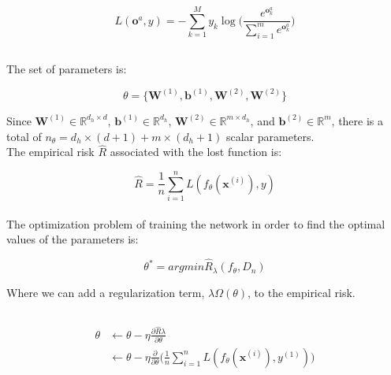 \documentclass[reqno]{amsart}
\theoremstyle{definition}
\theoremstyle{remark}
\numberwithin{equation}{section}
\begin{document}
\begin{equation}
L(\mathbf{o}^a, y) = -\sum_{k=1}^M y_{k}\log \Bigg(     
    \frac{e^{\mathbf{o}_k^a}}{\sum_{i=1}^m e^{\mathbf{o}_k^a}}
\Bigg)
\end{equation}


\subsection{}
The set of parameters is:

\begin{equation}
    \theta = \{\mathbf{W}^{(1)},\mathbf{b}^{(1)}, \mathbf{W}^{(2)}, \mathbf{W}^{(2)}\}
\end{equation}

Since $\mathbf{W}^{(1)} \in \mathbb{R}^{d_h \times d}$, $\mathbf{b}^{(1)} \in \mathbb{R}^{d_h}$, $\mathbf{W}^{(2)} \in \mathbb{R}^{m \times d_h}$, and $\mathbf{b}^{(2)} \in \mathbb{R}^{m}$, there is a total of $n_\theta= d_h \times (d+1) + m \times (d_h+1)$ scalar parameters.\\

The empirical risk $\hat{R}$ associated with the lost function is:

\begin{equation}
    \hat{R} = \frac{1}{n}\sum_{i=1}^{n} L(f_\theta(\mathbf{x}^{(i)}),y)
\end{equation}\\

The optimization problem of training the network in order to find the optimal values of the parameters is:

\begin{equation}
    \theta^* = argmin \hat{R}_\lambda(f_\theta, D_n)
\end{equation}

Where we can add a regularization term, $\lambda\Omega(\theta)$, to the empirical risk.

\subsection{}

\begin{align}
    \theta &\leftarrow \theta - \eta \frac{ \partial \hat{R} \lambda}{ \partial \theta} \\
    &\leftarrow \theta - \eta \frac{\partial}{\partial\theta}
    \Bigg(\frac{1}{n}\sum_{i=1}^n  L(f_\theta(\mathbf{x}^{(i)}), y^{(1)}) \Bigg)
\end{align}
\end{document}
